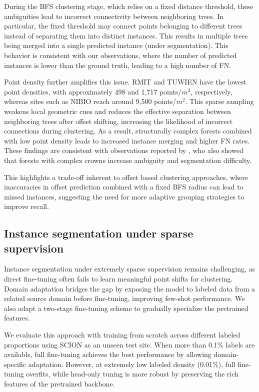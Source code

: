 \documentclass[review,authoryear]{elsarticle}
\begin{document}
During the BFS clustering stage, which relies on a fixed distance threshold, these ambiguities lead to incorrect connectivity between neighboring trees. In particular, the fixed threshold may connect points belonging to different trees instead of separating them into distinct instances. This results in multiple trees being merged into a single predicted instance (under segmentation). This behavior is consistent with our observations, where the number of predicted instances is lower than the ground truth, leading to a high number of FN.

Point density further amplifies this issue. RMIT and TUWIEN have the lowest point densities, with approximately 498 and 1,717 points/$m^2$, respectively, whereas sites such as NIBIO reach around 9,500 points/$m^2$. This sparse sampling weakens local geometric cues and reduces the effective separation between neighboring trees after offset shifting, increasing the likelihood of incorrect connections during clustering. As a result, structurally complex forests combined with low point density leads to increased instance merging and higher FN rates. These findings are consistent with observations reported by \cite{XIANG2024114078}, who also showed that forests with complex crowns increase ambiguity and segmentation difficulty.

This highlights a trade-off inherent to offset based clustering approaches, where inaccuracies in offset prediction combined with a fixed BFS radius can lead to missed instances, suggesting the need for more adaptive grouping strategies to improve recall. 

\subsection{Instance segmentation under sparse supervision}

Instance segmentation under extremely sparse supervision remains challenging, as direct fine-tuning often fails to learn meaningful point shifts for clustering. Domain adaptation bridges the gap by exposing the model to labeled data from a related source domain before fine-tuning, improving few-shot performance. We also adapt a two-stage fine-tuning scheme to gradually specialize the pretrained features.

We evaluate this approach with training from scratch across different labeled proportions using SCION as an unseen test site. When more than 0.1\% labels are available, full fine-tuning achieves the best performance by allowing domain-specific adaptation. However, at extremely low labeled density (0.01\%), full fine-tuning overfits, while head-only tuning is more robust by preserving the rich features of the pretrained backbone.
\end{document}

